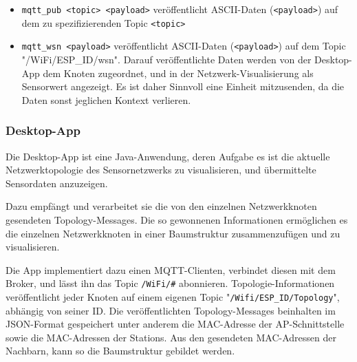 {			\begin{itemize}		
				\item \lstinline|mqtt_pub <topic> <payload>| veröffentlicht ASCII-Daten (\lstinline|<payload>|) auf dem zu spezifizierenden Topic \lstinline|<topic>|
				
				\item \lstinline|mqtt_wsn <payload>| veröffentlicht ASCII-Daten (\lstinline|<payload>|) auf dem Topic "/WiFi/ESP\_ID/wsn". Darauf veröffentlichte Daten werden von der Desktop-App dem Knoten zugeordnet, und in der Netzwerk-Visualisierung als Sensorwert angezeigt. Es ist daher Sinnvoll eine Einheit mitzusenden, da die Daten sonst jeglichen Kontext verlieren.
			\end{itemize}	
		
		\subsubsection{Desktop-App} 
			Die Desktop-App ist eine Java-Anwendung, deren Aufgabe es ist die aktuelle Netzwerktopologie des Sensornetzwerks zu visualisieren, und übermittelte Sensordaten anzuzeigen. 
			
			Dazu empfängt und verarbeitet sie die von den einzelnen Netzwerkknoten gesendeten Topology-Messages. Die so gewonnenen Informationen ermöglichen es die einzelnen Netzwerkknoten in einer Baumstruktur zusammenzufügen und zu visualisieren. 
			
			Die App implementiert dazu einen MQTT-Clienten, verbindet diesen mit dem Broker, und lässt ihn das Topic \texttt{/WiFi/\#} abonnieren. Topologie-Informationen veröffentlicht jeder Knoten auf einem eigenen Topic "\texttt{/Wifi/ESP\_ID/Topology}", abhängig von seiner ID. Die veröffentlichten Topology-Messages beinhalten im JSON-Format gespeichert unter anderem die MAC-Adresse der AP-Schnittstelle sowie die MAC-Adressen der Stations. Aus den gesendeten MAC-Adressen der Nachbarn, kann so die Baumstruktur gebildet werden. 
	}{}
		
